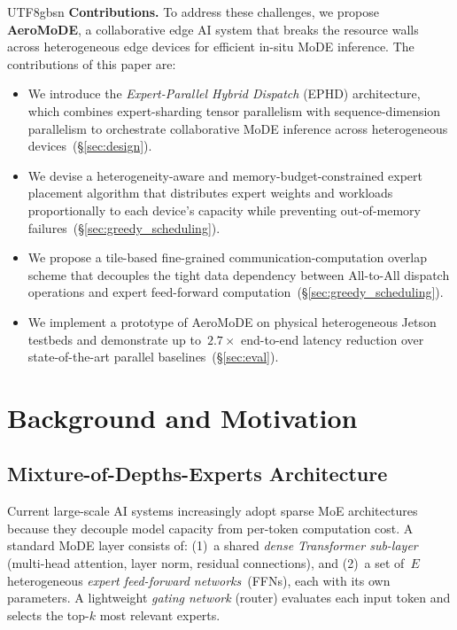 \documentclass[conference]{IEEEtran}
\begin{document}
\begin{CJK*}{UTF8}{gbsn}
\textbf{Contributions.}  To address these challenges, we propose
\textbf{AeroMoDE}, a collaborative edge AI system that breaks the
resource walls across heterogeneous edge devices for efficient
in-situ MoDE inference.  The contributions of this paper are:
\begin{itemize}
  \item We introduce the \emph{Expert-Parallel Hybrid Dispatch} (EPHD)
    architecture, which combines expert-sharding tensor parallelism with
    sequence-dimension parallelism to orchestrate collaborative MoDE
    inference across heterogeneous devices~(\S\ref{sec:design}).
  \item We devise a heterogeneity-aware and memory-budget-constrained
    expert placement algorithm that distributes expert weights and
    workloads proportionally to each device's capacity while preventing
    out-of-memory failures~(\S\ref{sec:greedy_scheduling}).
  \item We propose a tile-based fine-grained communication-computation
    overlap scheme that decouples the tight data dependency between
    All-to-All dispatch operations and expert feed-forward
    computation~(\S\ref{sec:greedy_scheduling}).
  \item We implement a prototype of AeroMoDE on physical
    heterogeneous Jetson testbeds and demonstrate up to~$2.7\times$
    end-to-end latency reduction over state-of-the-art parallel
    baselines~(\S\ref{sec:eval}).
\end{itemize}

\section{Background and Motivation}
\label{sec:background}

\subsection{Mixture-of-Depths-Experts Architecture}
\label{sec:bg_mode}

Current large-scale AI systems increasingly adopt sparse MoE
architectures~\cite{shazeer2017moe,lepikhin2021gshard,jiang2024mixtral}
because they decouple model capacity from per-token computation
cost.  A standard MoDE layer consists of: (1)~a shared
\emph{dense Transformer sub-layer} (multi-head attention, layer
norm, residual connections), and (2)~a set of~$E$ heterogeneous
\emph{expert feed-forward networks}~(FFNs), each with its own
parameters.  A lightweight \emph{gating network} (router)
evaluates each input token and selects the top-$k$ most relevant
experts.


\end{CJK*}
\end{document}
